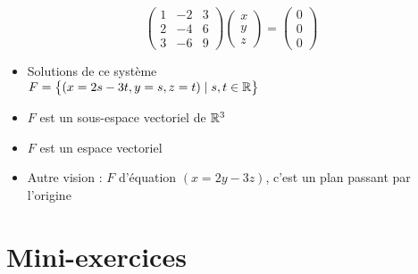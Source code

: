 \begin{frame}
\begin{exemple}
 $$\left(
\begin{array}{crc}
1 & -2 & 3\\ 2 & -4 & 6\\ 3 & -6 & 9
\end{array}\right) 
\left(\begin{array}{c}
x \\ y\\ z
\end{array}\right) = 
\left(\begin{array}{c}
0\\ 0\\0
\end{array}\right)$$

\pause

\begin{itemize}
  \item Solutions de ce système \\ \hfil $F = \big\{ (x =  2s - 3t, y  =  s, z  =  t) \mid s,t \in \mathbb{R} \big\}$
  \pause  
  \item $F$ est un sous-espace vectoriel de $\mathbb{R}^3$
  \pause
  \item $F$ est un espace vectoriel
  \pause
  \item Autre vision : $F$ d'équation $(x = 2y - 3z)$, c'est un plan passant par l'origine
\end{itemize}
\end{exemple} 
\end{frame}





\section{Mini-exercices}

